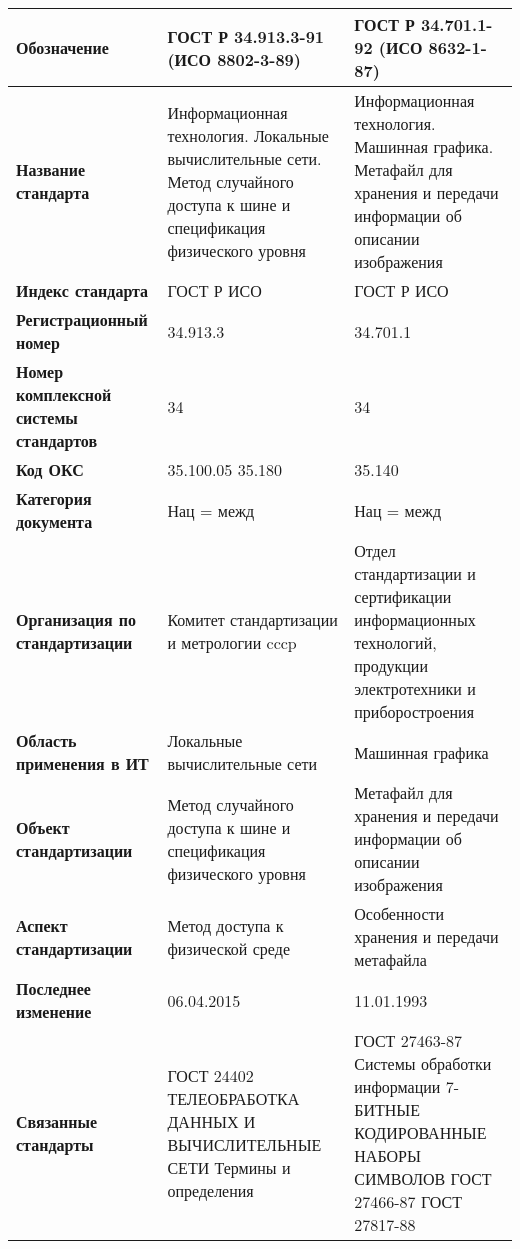 \begin{table}[h!tp]
	\small
	\centering
	\caption{}
	\label{table:national:international}
	\begin{tabular}{|p{10em}|p{14em}|p{14em}|}
		\hline
		\textbf{Обозначение}
			& \textbf{ГОСТ Р 34.913.3-91 (ИСО 8802-3-89)}
			& \textbf{ГОСТ Р 34.701.1-92 (ИСО 8632-1-87)} \\ \hline
		\textbf{Название стандарта}
			& Информационная технология. Локальные вычислительные сети. Метод случайного доступа к шине и спецификация физического уровня
			& Информационная технология. Машинная графика. Метафайл для хранения и передачи информации об описании изображения \\ \hline
		\textbf{Индекс стандарта}
			& ГОСТ Р ИСО & ГОСТ Р ИСО \\ \hline
		\textbf{Регистрационный номер}
			& 34.913.3 & 34.701.1 \\ \hline
		\textbf{Номер комплексной системы стандартов}
			& 34 & 34 \\ \hline
		\textbf{Код ОКС}
			& 35.100.05 35.180 & 35.140 \\ \hline
		\textbf{Категория документа}
			& Нац = межд & Нац = межд \\ \hline
		\textbf{Организация по стандартизации}
			& Комитет стандартизации и метрологии cccp
			& Отдел стандартизации и сертификации информационных технологий, продукции электротехники и приборостроения \\ \hline
		\textbf{Область применения в ИТ}
			& Локальные вычислительные сети
			& Машинная графика \\ \hline
		\textbf{Объект стандартизации}
			& Метод случайного доступа к шине и спецификация физического уровня
			& Метафайл для хранения и передачи информации об описании изображения \\ \hline
		\textbf{Аспект стандартизации}
			& Метод доступа к физической среде
			& Особенности хранения и передачи метафайла \\ \hline
		\textbf{Последнее изменение}
			& 06.04.2015 & 11.01.1993 \\ \hline
		\textbf{Связанные стандарты}
			& ГОСТ 24402 ТЕЛЕОБРАБОТКА ДАННЫХ И ВЫЧИСЛИТЕЛЬНЫЕ СЕТИ Термины и определения
            & ГОСТ 27463-87 Системы обработки информации 7-БИТНЫЕ КОДИРОВАННЫЕ НАБОРЫ СИМВОЛОВ ГОСТ 27466-87 ГОСТ 27817-88 \\ \hline
	\end{tabular}
\end{table}

